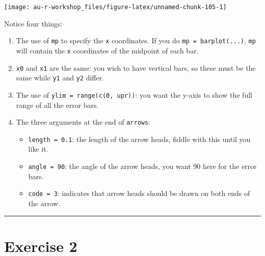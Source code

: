 \documentclass[]{book}
\providecommand{\tightlist}{%
  \setlength{\itemsep}{0pt}\setlength{\parskip}{0pt}}
\theoremstyle{definition}
\theoremstyle{definition}
\theoremstyle{definition}
\theoremstyle{remark}
\begin{document}
\begin{center}\texttt{[image: au-r-workshop\_files/figure-latex/unnamed-chunk-105-1]} \end{center}

Notice four things:

\begin{enumerate}
\def\labelenumi{\arabic{enumi}.}
\tightlist
\item
  The use of \texttt{mp} to specify the \texttt{x} coordinates. If you
  do \texttt{mp\ =\ barplot(...)}, \texttt{mp} will contain the
  \texttt{x} coordinates of the midpoint of each bar.
\item
  \texttt{x0} and \texttt{x1} are the same: you wish to have vertical
  bars, so these must be the same while \texttt{y1} and \texttt{y2}
  differ.
\item
  The use of \texttt{ylim\ =\ range(c(0,\ upr))}: you want the y-axis to
  show the full range of all the error bars.
\item
  The three arguments at the end of \texttt{arrows}:

  \begin{itemize}
  \tightlist
  \item
    \texttt{length\ =\ 0.1}: the length of the arrow heads, fiddle with
    this until you like it.
  \item
    \texttt{angle\ =\ 90}: the angle of the arrow heads, you want 90
    here for the error bars.
  \item
    \texttt{code\ =\ 3}: indicates that arrow heads should be drawn on
    both ends of the arrow.
  \end{itemize}
\end{enumerate}

\begin{center}\rule{0.5\linewidth}{\linethickness}\end{center}

\hypertarget{ex2}{\section*{Exercise 2}\label{ex2}}
\end{document}
